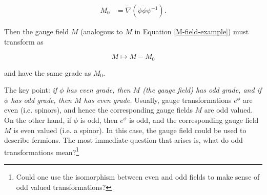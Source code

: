 \documentclass{article}
\begin{document}
\begin{align}
  M_0 &= \dot \nabla (\psi \dot \phi \psi^{-1}).
\end{align}

Then the gauge field $M$ (analogous to $M$ in Equation \ref{M-field-example}) must transform as

\begin{equation}
  M \mapsto M - M_0
\end{equation}

and have the same grade as $M_0$.

The key point: \emph{if $\phi$ has even grade, then $M$ (the gauge field) has odd grade, and if $\phi$ has odd grade, then $M$ has even grade.} Usually, gauge transformations $e^\phi$ are even (i.e. spinors), and hence the corresponding gauge fields $M$ are odd valued. On the other hand, if $\phi$ is odd, then $e^\phi$ is odd, and the corresponding gauge field $M$ is even valued (i.e. a spinor). In this case, the gauge field could be used to describe fermions. The most immediate question that arises is, what do odd transformations mean?\footnote{Could one use the isomorphism between even and odd fields to make sense of odd valued transformations?}
\end{document}
